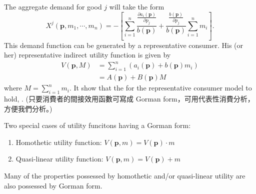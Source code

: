 The aggregate demand for good \( j \) will take the form 
\[
    X^j( \mathbf{p}, m_1, \cdots, m_n) = -\left[ \sum_{i=1}^{n} \frac{ \frac{\partial a_i(\mathbf{p})}{ \partial p_j } }{ b(\mathbf{p}) } + \frac{ \frac{b(\mathbf{p})}{ \partial p_j } }{ b(\mathbf{p}) } \sum_{i=1}^{n} m_i \right].
\]
This demand function can be generated by a representative consumer. 
His (or her) representative indirect utility function is given by
\begin{align*}
    V(\mathbf p, M) &= \sum_{i=1}^{n} \left( a_i(\mathbf{p}) + b(\mathbf{p}) m_i \right)  \\
    &= A(\mathbf p) + B(\mathbf p) M
\end{align*}
where \( M = \sum_{i=1}^{n} m_i \). It show that the  for the representative consumer model to hold, . (只要消費者的間接效用函數可寫成 Gorman form，可用代表性消費分析，方便我們分析。)


\noindent Two special cases of utility funcitons having a Gorman form:
\begin{enumerate}
    \item Homothetic utility function: \( V( \mathbf p, m) = V( \mathbf p) \cdot m\)
    \item Quasi-linear utility function: \( V( \mathbf p, m) = V( \mathbf p) + m\)
\end{enumerate}
Many of the properties possessed by homothetic and/or quasi-linear utility are also possessed by Gorman form.


